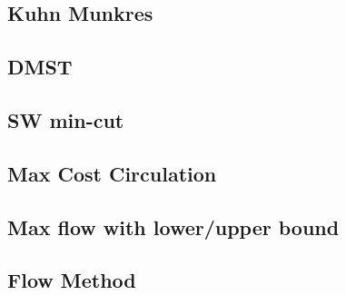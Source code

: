 \documentclass[a4paper,10pt,twocolumn,oneside]{article}
\begin{document}
%

%

\subsection{Kuhn Munkres}


\subsection{DMST}


\subsection{SW min-cut}


\subsection{Max Cost Circulation}


%

\subsection{Max flow with lower/upper bound}


%

\subsection{Flow Method}

\end{document}
